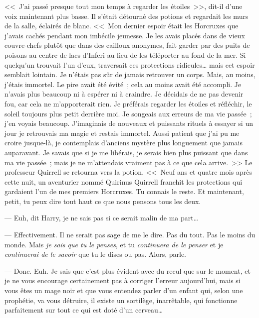 <<~J'ai passé presque tout mon temps à regarder les étoiles~>>, dit-il d'une voix maintenant plus basse. Il s'était détourné des potions et regardait les murs de la salle, éclairés de blanc. <<~Mon dernier espoir était les Horcruxes que j'avais cachés pendant mon imbécile jeunesse. Je les avais placés dans de vieux couvre-chefs plutôt que dans des cailloux anonymes, fait garder par des puits de poisons au centre de lacs d'Inferi au lieu de les téléporter au fond de la mer. Si quelqu'un trouvait l'un d'eux, traversait ces protections ridicules… mais cet espoir semblait lointain. Je n'étais pas sûr de jamais retrouver un corps. Mais, au moins, j'étais immortel. Le pire avait été évité~; cela au moins avait été accompli. Je n'avais plus beaucoup ni à espérer ni à craindre. Je décidais de ne pas devenir fou, car cela ne m'apporterait rien. Je préférais regarder les étoiles et réfléchir, le soleil toujours plus petit derrière moi. Je songeais aux erreurs de ma vie passée~; j'en voyais beaucoup. J'imaginais de nouveaux et puissants rituels à essayer si un jour je retrouvais ma magie et restais immortel. Aussi patient que j'ai pu me croire jusque-là, je contemplais d'anciens mystère plus longuement que jamais auparavant. Je savais que si je me libérais, je serais bien plus puissant que dans ma vie passée~; mais je ne m'attendais vraiment pas à ce que cela arrive.~>> Le professeur Quirrell se retourna vers la potion. <<~Neuf ans et quatre mois après cette nuit, un aventurier nommé Quirinus Quirrell franchit les protections qui gardaient l'un de mes premiers Horcruxes. Tu connais le reste. Et maintenant, petit, tu peux dire tout haut ce que nous pensons tous les deux.

--- Euh, dit Harry, je ne sais pas si ce serait malin de ma part…

--- Effectivement. Il ne serait pas sage de me le dire. Pas du tout. Pas le moins du monde. Mais \emph{je sais que tu le penses}, et tu \emph{continuera de le penser} et je \emph{continuerai de le savoir} que tu le dises ou pas. Alors, parle.

--- Donc. Euh. Je sais que c'est plus évident avec du recul que sur le moment, et je ne vous encourage certainement pas à corriger l'erreur aujourd'hui, mais si vous êtes un mage noir et que vous entendez parler d'un enfant qui, selon une prophétie, va vous détruire, il existe un sortilège, inarrêtable, qui fonctionne parfaitement sur tout ce qui est doté d'un cerveau…

